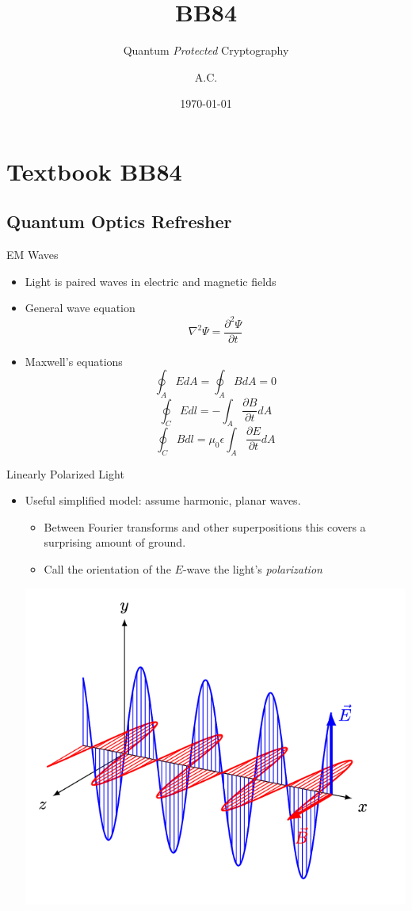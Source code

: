 \documentclass[pdf]{beamer}
\title{BB84}
\subtitle{Quantum \emph{Protected} Cryptography}
\author{A.C.}
\date{\today}
\begin{document}
\begin{frame}
  \titlepage
\end{frame}

\section{Textbook BB84}
\subsection{Quantum Optics Refresher}
\begin{frame}{EM Waves}
  \begin{itemize}
  \item Light is paired waves in electric and magnetic fields
  \item General wave equation \[\nabla^2\Psi = \frac{\partial^2\Psi}{\partial t} \]
  \item Maxwell's equations
    \[ \oint_A E dA = \oint_A B dA = 0 \]
    \[ \oint_C E dl = - \int_A \frac{\partial B}{\partial t} dA\]
    \[ \oint_C B dl = \mu_0 \epsilon \int_A \frac{\partial E}{\partial t} dA \]
  \end{itemize}
\end{frame}
\begin{frame}{Linearly Polarized Light}
  \begin{itemize}
  \item Useful simplified model: assume harmonic, planar waves.
    \begin{itemize}
    \item Between Fourier transforms and other superpositions this covers a
      surprising amount of ground.
    \item Call the orientation of the $E$-wave the light's \emph{polarization}
    \end{itemize}
    \begin{center}
      \includegraphics[scale=0.25]{images/EM-Wave.png}
    \end{center}
  \end{itemize}
\end{frame}
\end{document}
